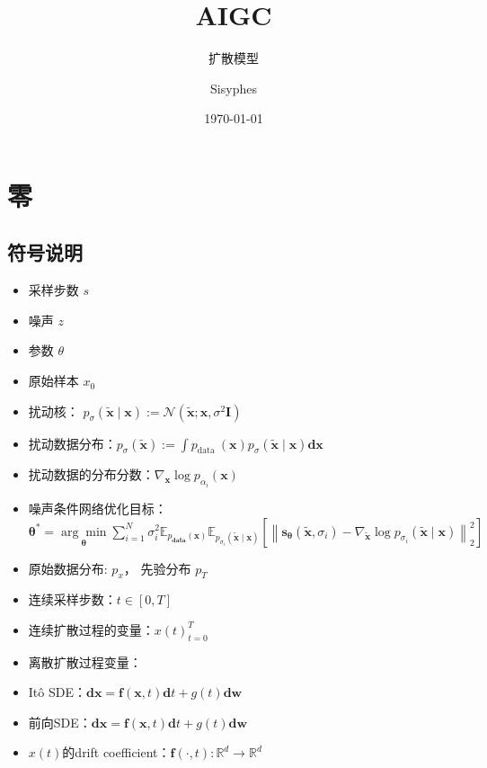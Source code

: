 \documentclass[lang=cn,newtx,10pt,scheme=chinese]{elegantbook}
\title{AIGC}
\subtitle{扩散模型}
\author{Sisyphes}
\institute{家里蹲}
\date{\today}
\begin{document}
\maketitle
\frontmatter

\tableofcontents

\mainmatter

\chapter{零}
\section{符号说明}
\begin{itemize}
    \item 采样步数 $s$
    \item 噪声 $z$
    \item 参数 $\theta$
    \item 原始样本 $x_0$
    \item  扰动核： $p_\sigma(\tilde{\mathbf{x}} \mid \mathbf{x}):=\mathcal{N}\left(\tilde{\mathbf{x}} ;\mathbf{x}, \sigma^2 \mathbf{I}\right)$
    \item 扰动数据分布：$p_\sigma(\tilde{\mathbf{x}}):=\int p_{\text {data }}(\mathbf{x})p_\sigma(\tilde{\mathbf{x}} \mid \mathbf{x}) \mathbf{d} \mathbf{x}$
    \item 扰动数据的分布分数：$\nabla_{\mathbf{x}} \log p_{\alpha_i}(\mathbf{x})$
    \item 噪声条件网络优化目标：$\boldsymbol{\theta}^*=\underset{\boldsymbol{\theta}}{\arg \min } \sum_{i=1}^N \sigma_i^2 \mathbb{E}_{p_{\mathbf{data}}(\mathbf{x})} \mathbb{E}_{p_{\sigma_i}(\tilde{\mathbf{x}} \mid \mathbf{x})}\left[\left\|\mathbf{s}_{\boldsymbol{\theta}}\left(\tilde{\mathbf{x}}, \sigma_i\right)-\nabla_{\tilde{\mathbf{x}}} \log p_{\sigma_i}(\tilde{\mathbf{x}} \mid \mathbf{x})\right\|_2^2\right]$
    \item  原始数据分布: $p_x$， 先验分布 $p_T$
    \item 连续采样步数：$t \in [0, T]$
    \item 连续扩散过程的变量：${x(t)}_{t=0}^{T}$
    \item 离散扩散过程变量：
    \item Itô SDE：$\mathbf{d} \mathbf{x}=\mathbf{f}(\mathbf{x}, t) \mathbf{d} t+g(t) \mathbf{d} \mathbf{w}$
    \item  前向SDE：$\mathbf{d} \mathbf{x}=\mathbf{f}(\mathbf{x}, t) \mathbf{d} t+g(t) \mathbf{d} \mathbf{w}$
    \item $x(t)$的drift coefficient：$\mathbf{f}(\cdot, t): \mathbb{R}^d \rightarrow \mathbb{R}^d$

\end{itemize}
\end{document}
